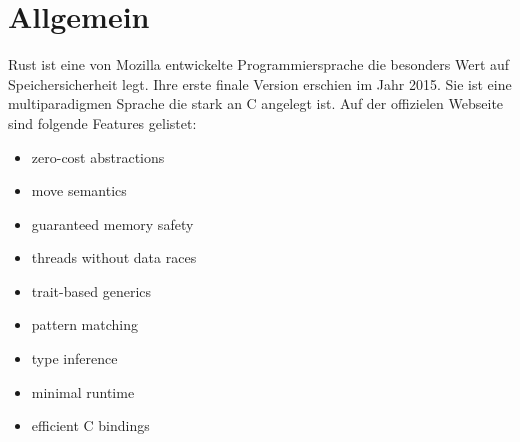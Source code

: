 \section{Allgemein}
Rust ist eine von Mozilla entwickelte Programmiersprache die besonders Wert auf Speichersicherheit legt. Ihre erste finale Version erschien im Jahr 2015.
Sie ist eine multiparadigmen Sprache die stark an C angelegt ist.
Auf der offizielen Webseite sind folgende Features gelistet:

\begin{itemize}	
\item zero-cost abstractions
\item move semantics
\item guaranteed memory safety
\item threads without data races
\item trait-based generics
\item pattern matching
\item type inference
\item minimal runtime
\item efficient C bindings
\end{itemize}






